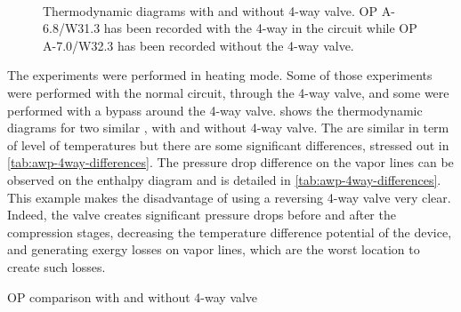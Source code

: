 \begin{figure}[htbp]
  \centering
  \hspace{1em}
  \\
  \hspace{1em}
  \caption[A-6.8/W31.3 \& A-7.0/W32.3 -- Thermodynamic diagrams with
  and without 4-way valve]{Thermodynamic diagrams with and without
    4-way valve. OP A-6.8/W31.3 has been recorded with the 4-way in
    the circuit while OP A-7.0/W32.3 has been recorded without the
    4-way valve.}
  \label{fig:awp-w-wo-4way-diagrams}
\end{figure}


The experiments were performed in heating mode. Some of those
experiments were performed with the normal circuit, through the 4-way
valve, and some were performed with a bypass around the 4-way
valve.  shows the thermodynamic
diagrams for two similar \OP{}, with and without 4-way
valve. The \OP{} are similar in term of level of temperatures but
there are some significant differences, stressed out in
\cref{tab:awp-4way-differences}. The pressure drop
difference on the vapor lines can be observed on the enthalpy diagram
and is detailed in \cref{tab:awp-4way-differences}. This example makes
the disadvantage of using a reversing 4-way valve very clear. Indeed,
the valve creates significant pressure drops before and after the
compression stages, decreasing the temperature difference potential of
the device, and generating exergy losses on vapor lines, which are the
worst location to create such losses.

\begin{table}[htbp]
  \begin{center}
    \footnotesize
    
  \end{center}
  \caption{OP comparison with and without 4-way valve}
  \label{tab:awp-4way-differences}
\end{table}


